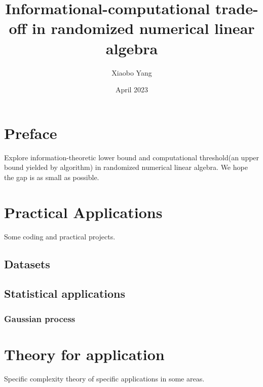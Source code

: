 \documentclass[10pt]{book}
\title{Informational-computational trade-off in randomized numerical linear algebra}
\author{Xiaobo Yang}
\date{April 2023}
\begin{document}
\allowdisplaybreaks %

\setlength{\parindent}{2em}

\maketitle

\tableofcontents\newpage
\chapter*{Preface}
Explore information-theoretic lower bound and computational threshold(an upper bound yielded by algorithm) in randomized numerical linear algebra. We hope the gap is as small as possible.

\chapter{Practical Applications}
Some coding and practical projects.
\section{Datasets}


\section{Statistical applications}

\subsection{Gaussian process}

\chapter{Theory for application}
Specific complexity theory of specific applications in some areas.
\end{document}
